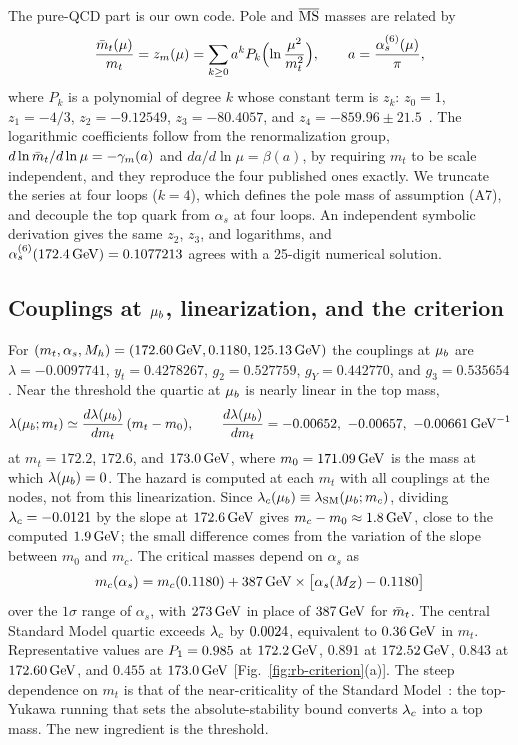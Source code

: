 The pure-QCD part is our own code.
Pole and $\overline{\mathrm{MS}}$ masses are related by
\begin{equation}
\frac{\bar m_t(\mu)}{m_t}=z_m(\mu)=\sum_{k\ge0}a^kP_k\Bigl(\ln\frac{\mu^2}{m_t^2}\Bigr),\qquad a=\frac{\alpha_s^{(6)}(\mu)}{\pi},
\label{eq:rb-zm}
\end{equation}
where $P_k$ is a polynomial of degree $k$ whose constant term is $z_k$: $z_0=1$, $z_1=-4/3$, $z_2=-9.12549$, $z_3=-80.4057$, and $z_4=-859.96\pm21.5$~\cite{Marquard:2015qpa,Marquard:2016dcn}. %
The logarithmic coefficients follow from the renormalization group, $d\ln\bar m_t/d\ln\mu=-\gamma_m(a)$ and $da/d\ln\mu=\beta(a)$, by requiring $m_t$ to be scale independent, and they reproduce the four published ones exactly.
We truncate the series at four loops ($k=4$), which defines the pole mass of assumption (A7), and decouple the top quark from $\alpha_s$ at four loops.
An independent symbolic derivation gives the same $z_2$, $z_3$, and logarithms, and $\alpha_s^{(6)}(172.4\,\mathrm{GeV})=0.1077213$ agrees with a 25-digit numerical solution. %

\subsection{Couplings at \texorpdfstring{$\mu_b$}{mu-b}, linearization, and the criterion}
\label{sec:rb-sm-criterion}

For $(m_t,\alpha_s,M_h)=(172.60\,\mathrm{GeV},0.1180,125.13\,\mathrm{GeV})$ the couplings at $\mu_b$ are $\lambda=-0.0097741$, $y_t=0.4278267$, $g_2=0.527759$, $g_Y=0.442770$, and $g_3=0.535654$. %
Near the threshold the quartic at $\mu_b$ is nearly linear in the top mass,
\begin{equation}
\lambda(\mub;m_t)\simeq\frac{d\lambda(\mub)}{dm_t}\,(m_t-m_0),\qquad
\frac{d\lambda(\mub)}{dm_t}=-0.00652,\ -0.00657,\ -0.00661\GeV^{-1} %
\label{eq:rb-lin}
\end{equation}
at $m_t=172.2$, $172.6$, and $173.0\,\mathrm{GeV}$, where $m_0=171.09\,\mathrm{GeV}$ is the mass at which $\lambda(\mu_b)=0$. %
The hazard is computed at each $m_t$ with all couplings at the nodes, not from this linearization.
Since $\lambda_c(\mu_b)\equiv\lambda_{\rm SM}(\mu_b;m_c)$, dividing $\lambda_c=-0.0121$ by the slope at $172.6\,\mathrm{GeV}$ gives $m_c-m_0\approx1.8\,\mathrm{GeV}$, close to the computed $1.9\,\mathrm{GeV}$; the small difference comes from the variation of the slope between $m_0$ and $m_c$. %
The critical masses depend on $\alpha_s$ as
\begin{equation}
m_c(\alpha_s)=m_c(0.1180)+387\GeV\times\bigl[\alpha_s(M_Z)-0.1180\bigr] %
\label{eq:rb-alphas}
\end{equation}
over the $1\sigma$ range of $\alpha_s$, with $273\,\mathrm{GeV}$ in place of $387\,\mathrm{GeV}$ for $\bar m_t$. %
The central Standard Model quartic exceeds $\lambda_c$ by $0.0024$, equivalent to $0.36\,\mathrm{GeV}$ in $m_t$. %
Representative values are $P_1=0.985$ at $172.2\,\mathrm{GeV}$, $0.891$ at $172.52\,\mathrm{GeV}$, $0.843$ at $172.60\,\mathrm{GeV}$, and $0.455$ at $173.0\,\mathrm{GeV}$ [Fig.~\ref{fig:rb-criterion}(a)]. %
The steep dependence on $m_t$ is that of the near-criticality of the Standard Model~\cite{Degrassi:2012ry,Buttazzo:2013uya,Bednyakov:2015sca}: the top-Yukawa running that sets the absolute-stability bound converts $\lambda_c$ into a top mass.
The new ingredient is the threshold.

